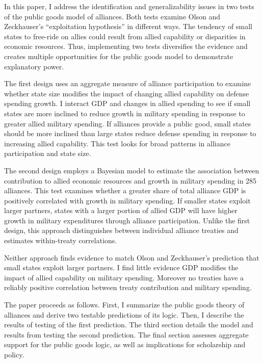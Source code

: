 \documentclass[12pt]{article}
\begin{document}
In this paper, I address the identification and generalizability issues in two tests of the public goods model of alliances.  
Both tests examine Olson and Zeckhauser's ``exploitation hypothesis'' in different ways.   
The tendency of small states to free-ride on allies could result from allied capability or disparities in economic resources.
Thus, implementing two tests diversifies the evidence and creates multiple opportunities for the public goods model to demonstrate explanatory power. 


The first design uses an aggregate measure of alliance participation to examine whether state size modifies the impact of changing allied capability on defense spending growth.
I interact GDP and changes in allied spending to see if small states are more inclined to reduce growth in military spending in response to greater allied military spending. 
If alliances provide a public good, small states should be more inclined than large states reduce defense spending in response to increasing allied capability. 
This test looks for broad patterns in alliance participation and state size. 


The second design employs a Bayesian model to estimate the association between contribution to allied economic resources and growth in military spending in 285 alliances. 
This test examines whether a greater share of total alliance GDP is positively correlated with growth in military spending. 
If smaller states exploit larger partners, states with a larger portion of allied GDP will have higher growth in military expenditures through alliance participation.
Unlike the first design, this approach distinguishes between individual alliance treaties and estimates within-treaty correlations. 


Neither approach finds evidence to match Olson and Zeckhauser's prediction that small states exploit larger partners. 
I find little evidence GDP modifies the impact of allied capability on military spending.
Moreover no treaties have a reliably positive correlation between treaty contribution and military spending. 


The paper proceeds as follows.
First, I summarize the public goods theory of alliances and derive two testable predictions of its logic.
Then, I describe the results of testing of the first prediction.
The third section details the model and results from testing the second prediction. 
The final section assesses aggregate support for the public goods logic, as well as implications for scholarship and policy. 
\end{document}

